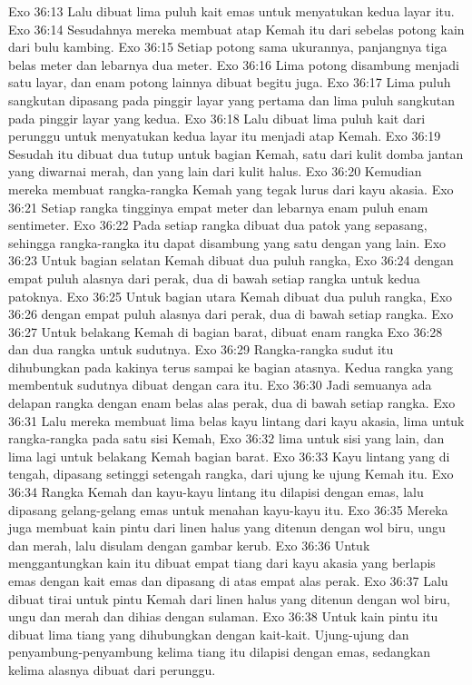 Exo 36:13  Lalu dibuat lima puluh kait emas untuk menyatukan kedua layar itu.
Exo 36:14  Sesudahnya mereka membuat atap Kemah itu dari sebelas potong kain dari bulu kambing.
Exo 36:15  Setiap potong sama ukurannya, panjangnya tiga belas meter dan lebarnya dua meter.
Exo 36:16  Lima potong disambung menjadi satu layar, dan enam potong lainnya dibuat begitu juga.
Exo 36:17  Lima puluh sangkutan dipasang pada pinggir layar yang pertama dan lima puluh sangkutan pada pinggir layar yang kedua.
Exo 36:18  Lalu dibuat lima puluh kait dari perunggu untuk menyatukan kedua layar itu menjadi atap Kemah.
Exo 36:19  Sesudah itu dibuat dua tutup untuk bagian Kemah, satu dari kulit domba jantan yang diwarnai merah, dan yang lain dari kulit halus.
Exo 36:20  Kemudian mereka membuat rangka-rangka Kemah yang tegak lurus dari kayu akasia.
Exo 36:21  Setiap rangka tingginya empat meter dan lebarnya enam puluh enam sentimeter.
Exo 36:22  Pada setiap rangka dibuat dua patok yang sepasang, sehingga rangka-rangka itu dapat disambung yang satu dengan yang lain.
Exo 36:23  Untuk bagian selatan Kemah dibuat dua puluh rangka,
Exo 36:24  dengan empat puluh alasnya dari perak, dua di bawah setiap rangka untuk kedua patoknya.
Exo 36:25  Untuk bagian utara Kemah dibuat dua puluh rangka,
Exo 36:26  dengan empat puluh alasnya dari perak, dua di bawah setiap rangka.
Exo 36:27  Untuk belakang Kemah di bagian barat, dibuat enam rangka
Exo 36:28  dan dua rangka untuk sudutnya.
Exo 36:29  Rangka-rangka sudut itu dihubungkan pada kakinya terus sampai ke bagian atasnya. Kedua rangka yang membentuk sudutnya dibuat dengan cara itu.
Exo 36:30  Jadi semuanya ada delapan rangka dengan enam belas alas perak, dua di bawah setiap rangka.
Exo 36:31  Lalu mereka membuat lima belas kayu lintang dari kayu akasia, lima untuk rangka-rangka pada satu sisi Kemah,
Exo 36:32  lima untuk sisi yang lain, dan lima lagi untuk belakang Kemah bagian barat.
Exo 36:33  Kayu lintang yang di tengah, dipasang setinggi setengah rangka, dari ujung ke ujung Kemah itu.
Exo 36:34  Rangka Kemah dan kayu-kayu lintang itu dilapisi dengan emas, lalu dipasang gelang-gelang emas untuk menahan kayu-kayu itu.
Exo 36:35  Mereka juga membuat kain pintu dari linen halus yang ditenun dengan wol biru, ungu dan merah, lalu disulam dengan gambar kerub.
Exo 36:36  Untuk menggantungkan kain itu dibuat empat tiang dari kayu akasia yang berlapis emas dengan kait emas dan dipasang di atas empat alas perak.
Exo 36:37  Lalu dibuat tirai untuk pintu Kemah dari linen halus yang ditenun dengan wol biru, ungu dan merah dan dihias dengan sulaman.
Exo 36:38  Untuk kain pintu itu dibuat lima tiang yang dihubungkan dengan kait-kait. Ujung-ujung dan penyambung-penyambung kelima tiang itu dilapisi dengan emas, sedangkan kelima alasnya dibuat dari perunggu.
